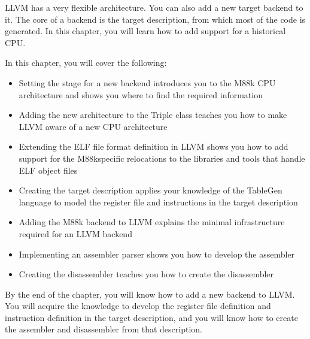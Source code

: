 LLVM has a very flexible architecture. You can also add a new target backend to it. The core of a backend is the target description, from which most of the code is generated. In this chapter, you will learn how to add support for a historical CPU.

In this chapter, you will cover the following:

\begin{itemize}
\item
Setting the stage for a new backend introduces you to the M88k CPU architecture and shows you where to find the required information

\item
Adding the new architecture to the Triple class teaches you how to make LLVM aware of a new CPU architecture

\item
Extending the ELF file format definition in LLVM shows you how to add support for the M88kspecific relocations to the libraries and tools that handle ELF object files

\item
Creating the target description applies your knowledge of the TableGen language to model the register file and instructions in the target description

\item
Adding the M88k backend to LLVM explains the minimal infrastructure required for an LLVM backend

\item
Implementing an assembler parser shows you how to develop the assembler

\item
Creating the disassembler teaches you how to create the disassembler
\end{itemize}

By the end of the chapter, you will know how to add a new backend to LLVM. You will acquire the knowledge to develop the register file definition and instruction definition in the target description, and you will know how to create the assembler and disassembler from that description.























